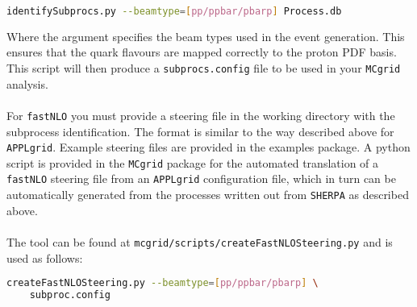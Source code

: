 \documentclass[11pt]{article}
\newcommand{\mcgrid} {{\tt MCgrid}\xspace}
\newcommand{\appl} {{\tt APPLgrid}\xspace}
\newcommand{\fnlo} {{\tt fastNLO}\xspace}
\newcommand{\sherpa} {{\tt SHERPA}\xspace}
\begin{document}
\begin{lstlisting}[language=bash]
identifySubprocs.py --beamtype=[pp/ppbar/pbarp] Process.db
\end{lstlisting}

Where the argument specifies the beam types used in the event generation. This ensures that the quark flavours are mapped correctly to the proton PDF basis. This script will then produce a \lstinline[language=bash]{subprocs.config} file to be used in your \mcgrid analysis. \\\\

For \fnlo you must provide a steering file in the working directory with the subprocess identification. The format is similar to the way described above for \appl. Example steering files are provided in the examples package.
A python script is provided in the \mcgrid package for the automated translation of a \fnlo steering file from an \appl configuration file, which in turn can be automatically generated from the processes written out from \sherpa as described above. 
\\\\
The tool can be found at \lstinline[language=bash]{mcgrid/scripts/createFastNLOSteering.py} and is used as follows:
\clearpage
\begin{lstlisting}[language=bash]
createFastNLOSteering.py --beamtype=[pp/ppbar/pbarp] \
    subproc.config
\end{lstlisting}

\label{sec:subproc}
\end{document}

